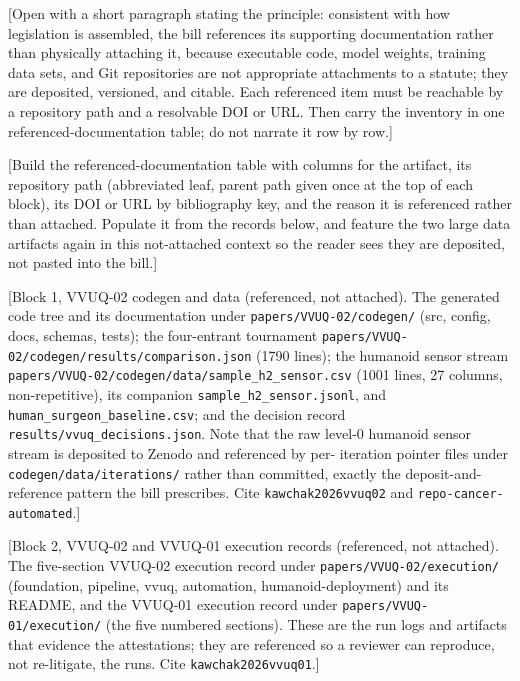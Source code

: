 
[Open with a short paragraph stating the principle: consistent with how
legislation is assembled, the bill references its supporting documentation rather
than physically attaching it, because executable code, model weights, training
data sets, and Git repositories are not appropriate attachments to a statute; they
are deposited, versioned, and citable. Each referenced item must be reachable by a
repository path and a resolvable DOI or URL. Then carry the inventory in one
referenced-documentation table; do not narrate it row by row.]

[Build the referenced-documentation table with columns for the artifact, its
repository path (abbreviated leaf, parent path given once at the top of each
block), its DOI or URL by bibliography key, and the reason it is referenced rather
than attached. Populate it from the records below, and feature the two large data
artifacts again in this not-attached context so the reader sees they are
deposited, not pasted into the bill.]

[Block 1, VVUQ-02 codegen and data (referenced, not attached). The generated code
tree and its documentation under \texttt{papers/VVUQ-02/codegen/} (src, config,
docs, schemas, tests); the four-entrant tournament
\texttt{papers/VVUQ-02/codegen/results/comparison.json} (1790 lines); the humanoid
sensor stream \texttt{papers/VVUQ-02/codegen/data/sample\_h2\_sensor.csv} (1001
lines, 27 columns, non-repetitive), its companion
\texttt{sample\_h2\_sensor.jsonl}, and \texttt{human\_surgeon\_baseline.csv}; and
the decision record \texttt{results/vvuq\_decisions.json}. Note that the raw
level-0 humanoid sensor stream is deposited to Zenodo and referenced by per-
iteration pointer files under \texttt{codegen/data/iterations/} rather than
committed, exactly the deposit-and-reference pattern the bill prescribes. Cite
\texttt{kawchak2026vvuq02} and \texttt{repo-cancer-automated}.]

[Block 2, VVUQ-02 and VVUQ-01 execution records (referenced, not attached). The
five-section VVUQ-02 execution record under \texttt{papers/VVUQ-02/execution/}
(foundation, pipeline, vvuq, automation, humanoid-deployment) and its README, and
the VVUQ-01 execution record under \texttt{papers/VVUQ-01/execution/} (the five
numbered sections). These are the run logs and artifacts that evidence the
attestations; they are referenced so a reviewer can reproduce, not re-litigate,
the runs. Cite \texttt{kawchak2026vvuq01}.]

